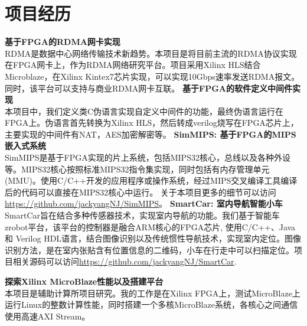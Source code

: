 \documentclass[11pt,a4paper]{moderncv}
\begin{document}
	\section{项目经历}
	{
		\smallskip
		\textbf{基于FPGA的RDMA网卡实现}
		\medskip \\
		RDMA是数据中心网络传输技术新趋势。本项目是将目前主流的RDMA协议实现在FPGA网卡上，作为RDMA网络研究平台。项目采用Xilinx HLS结合Microblaze，在Xilinx Kintex7芯片实现，可以实现10Gbps速率发送RDMA报文。同时，该平台可以支持与商业RDMA网卡互联。
	}
	{
		\smallskip
		\textbf{基于FPGA的软件定义中间件实现}
		\medskip \\
		本项目中，我们定义类C伪语言实现自定义中间件的功能，最终伪语言运行在FPGA上。伪语言首先转换为Xilinx HLS，然后转成verilog烧写在FPGA芯片上，主要实现的中间件有NAT，AES加密解密等。
	}
	{
		\smallskip
		\textbf{SimMIPS: 基于FPGA的MIPS嵌入式系统}
		\medskip \\
		SimMIPS是基于FPGA实现的片上系统，包括MIPS32核心，总线以及各种外设等。MIPS32核心按照标准MIPS32指令集实现，同时包括有内存管理单元(MMU)。使用C/C++开发的应用程序或操作系统，经过MIPS交叉编译工具编译后的代码可以直接在MIPS32核心中运行。
		关于本项目更多的细节可以访问 \url{https://github.com/jackyangNJ/SimMIPS}。
	}
	{
		\smallskip
		\textbf{SmartCar: 室内导航智能小车}
		\medskip  \\
		SmartCar旨在结合多种传感器技术，实现室内导航的功能。我们基于智能车zrobot平台，该平台的控制器是融合ARM核心的FPGA芯片, 使用C/C++、Java 和 Verilog HDL语言，结合图像识别以及传统惯性导航技术，实现室内定位。图像识别方法，是在室内张贴含有位置信息的二维码，小车在行走中可以扫描定位。项目相关源码可以访问\url{https://github.com/jackyangNJ/SmartCar}.
	}
	
	{
		\smallskip
		\textbf{探索Xilinx MicroBlaze性能以及搭建平台}
		\medskip  \\
		本项目是辅助计算所项目研究。我的工作是在Xilinx FPGA上，测试MicroBlaze上运行Linux的整数计算性能，同时搭建一个多核MicroBlaze系统，各核心之间通信使用高速AXI Stream。
	}
	
	
	
	\nocite{*}
	
	
	
\end{document}
